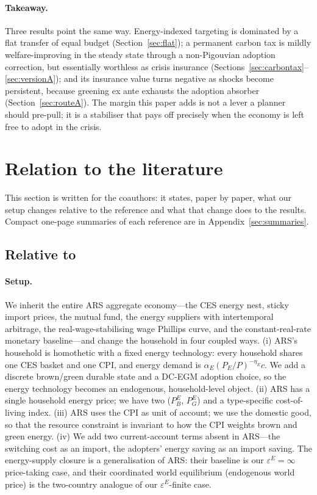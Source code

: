 \documentclass[11pt,a4paper]{article}
\begin{document}
\paragraph{Takeaway.} Three results point the same way. Energy-indexed targeting
is dominated by a flat transfer of equal budget (Section~\ref{sec:flat}); a
permanent carbon tax is mildly welfare-improving in the steady state through a
non-Pigouvian adoption correction, but essentially worthless as crisis insurance
(Sections~\ref{sec:carbontax}--\ref{sec:versionA}); and its insurance value turns
negative as shocks become persistent, because greening ex ante exhausts the
adoption absorber (Section~\ref{sec:routeA}). The margin this paper adds is not a
lever a planner should pre-pull; it is a stabiliser that pays off precisely when
the economy is left free to adopt in the crisis.

\section{Relation to the literature}
\label{sec:lit}

This section is written for the coauthors: it states, paper by paper, what our
setup changes relative to the reference and what that change does to the
results. Compact one-page summaries of each reference are in
Appendix~\ref{sec:summaries}.

\subsection{Relative to \citet{ARS2024}}

\paragraph{Setup.} We inherit the entire ARS aggregate economy---the CES
energy nest, sticky import prices, the mutual fund, the energy suppliers with
intertemporal arbitrage, the real-wage-stabilising wage Phillips curve, and the
constant-real-rate monetary baseline---and change the household in four coupled
ways. (i) ARS's household is homothetic with a fixed energy technology: every
household shares one CES basket and one CPI, and energy demand is
$\alpha_E(P_E/P)^{-\eta_E}c$. We add a discrete brown/green durable state and a
DC-EGM adoption choice, so the energy technology becomes an endogenous,
household-level object. (ii) ARS has a single household energy price; we have
two ($P^E_B$, $P^E_G$) and a type-specific cost-of-living index. (iii) ARS uses
the CPI as unit of account; we use the domestic good, so that the resource
constraint is invariant to how the CPI weights brown and green energy. (iv) We
add two current-account terms absent in ARS---the switching cost as an import,
the adopters' energy saving as an import saving. The energy-supply closure is a
generalisation of ARS: their baseline is our $\varepsilon^E=\infty$
price-taking case, and their coordinated world equilibrium (endogenous world
price) is the two-country analogue of our $\varepsilon^E$-finite case.
\end{document}
